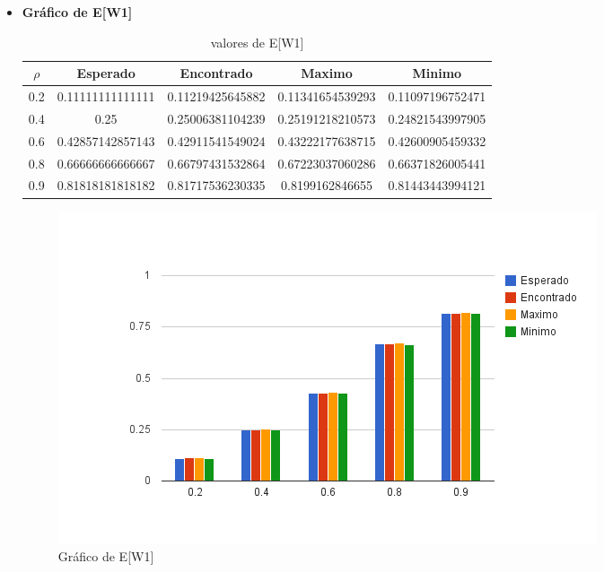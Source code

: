 \documentclass[a4paper,10pt]{article}
\begin{document}
      \begin{itemize}

\newpage

\item \textbf{Gráfico de E[W1]}
 \begin{table}[H] 
	      \begin{tabular}{|c|c|c|c|c|}
		    \hline
		    $\rho$	&Esperado		&Encontrado		&Maximo			&Minimo			\\ \hline
		    0.2		&0.11111111111111	&0.11219425645882	&0.11341654539293	&0.11097196752471	\\ \hline
		    0.4		&0.25			&0.25006381104239	&0.25191218210573	&0.24821543997905	\\ \hline
		    0.6		&0.42857142857143	&0.42911541549024	&0.43222177638715	&0.42600905459332	\\ \hline
		    0.8		&0.66666666666667	&0.66797431532864	&0.67223037060286	&0.66371826005441	\\ \hline
		    0.9		&0.81818181818182	&0.81717536230335	&0.8199162846655	&0.81443443994121	\\ \hline
	      \end{tabular}
	      \caption{valores de E[W1]}
\end{table}
\begin{figure}[H]
    \center
    \includegraphics[scale=0.7]{E[W1].png}
    \caption{Gráfico de E[W1]}
\end{figure}
\newpage


\end{itemize}
\end{document}
